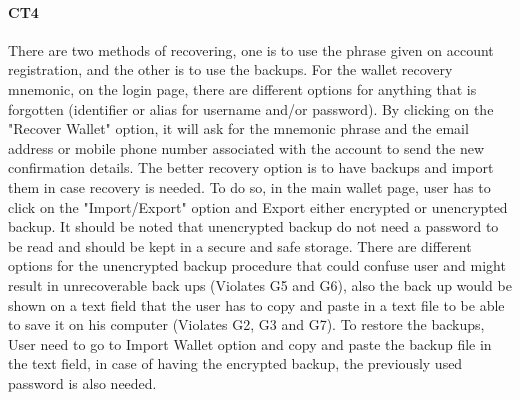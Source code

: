 \paragraph{CT4} There are two methods of recovering, one is to use the phrase given on account registration, and the other is to use the backups. For the wallet recovery mnemonic, on the login page, there are different options for anything that is forgotten (identifier or alias for username and/or password). By clicking on the "Recover Wallet" option, it will ask for the mnemonic phrase and the email address or mobile phone number associated with the account to send the new confirmation details. The better recovery option is to have backups and import them in case recovery is needed. To do so, in the main wallet page, user has to click on the "Import/Export" option and Export either encrypted or unencrypted backup. It should be noted that unencrypted backup do not need a password to be read and should be kept in a secure and safe storage. There are different options for the unencrypted backup procedure that could confuse user and might result in unrecoverable back ups (Violates G5 and G6), also the back up would be shown on a text field that the user has to copy and paste in a text file to be able to save it on his computer (Violates G2, G3 and G7). To restore the backups, User need to go to Import Wallet option and copy and paste the backup file in the text field, in case of having the encrypted backup, the previously used password is also needed. 
